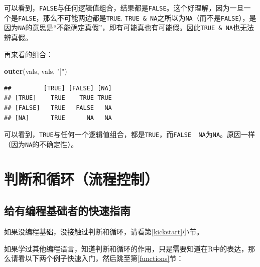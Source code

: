 \documentclass[]{book}
\newenvironment{Shaded}{\begin{snugshade}}{\end{snugshade}}
\newcommand{\CommentTok}[1]{\textcolor[rgb]{0.56,0.35,0.01}{\textit{#1}}}
\newcommand{\ControlFlowTok}[1]{\textcolor[rgb]{0.13,0.29,0.53}{\textbf{#1}}}
\newcommand{\DecValTok}[1]{\textcolor[rgb]{0.00,0.00,0.81}{#1}}
\newcommand{\KeywordTok}[1]{\textcolor[rgb]{0.13,0.29,0.53}{\textbf{#1}}}
\newcommand{\NormalTok}[1]{#1}
\newcommand{\OperatorTok}[1]{\textcolor[rgb]{0.81,0.36,0.00}{\textbf{#1}}}
\newcommand{\StringTok}[1]{\textcolor[rgb]{0.31,0.60,0.02}{#1}}
\begin{document}
可以看到，\texttt{FALSE}与任何逻辑值组合，结果都是\texttt{FALSE}。这个好理解，因为一旦一个是\texttt{FALSE}，那么不可能两边都是\texttt{TRUE}. \texttt{TRUE\ \&\ NA}之所以为\texttt{NA}（而不是\texttt{FALSE}），是因为\texttt{NA}的意思是``不能确定真假''，即有可能真也有可能假。因此\texttt{TRUE\ \&\ NA}也无法辨真假。

再来看\texttt{\textbar{}}的组合：

\begin{Shaded}
\begin{Highlighting}[]
\KeywordTok{outer}\NormalTok{(vals, vals, }\StringTok{"|"}\NormalTok{)}
\end{Highlighting}
\end{Shaded}

\begin{verbatim}
##         [TRUE] [FALSE] [NA]
## [TRUE]    TRUE    TRUE TRUE
## [FALSE]   TRUE   FALSE   NA
## [NA]      TRUE      NA   NA
\end{verbatim}

可以看到，\texttt{TRUE}与任何一个逻辑值组合，都是\texttt{TRUE}，而\texttt{FALSE\ \textbar{}\ NA}为\texttt{NA}。原因一样（因为\texttt{NA}的不确定性）。

\hypertarget{control-flow}{%
\section{判断和循环（流程控制）}\label{control-flow}}

\hypertarget{control-flow-for-programmers}{%
\subsection{给有编程基础者的快速指南}\label{control-flow-for-programmers}}

如果没编程基础，没接触过判断和循环，请看第\ref{kickstart}小节。

如果学过其他编程语言，知道判断和循环的作用，只是需要知道在R中的表达，那么请看以下两个例子快速入门，然后跳至第\ref{functions}节：

\begin{Shaded}
\end{Shaded}
\end{document}
